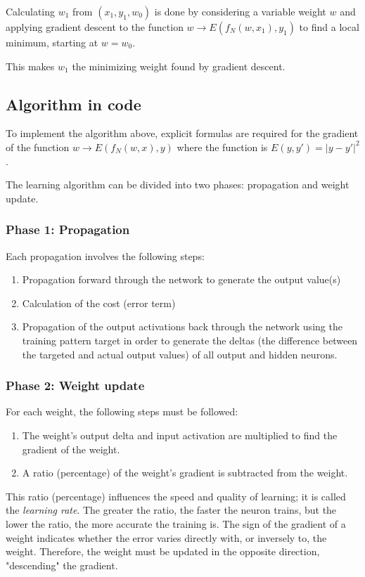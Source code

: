 \documentclass[a4paper]{article}
\begin{document}
Calculating $w_1$ from $(x_1, y_1, w_0)$ is done by considering a variable weight $w$ and applying gradient descent to the function $w\rightarrow E(f_N(w, x_1), y_1)$ to find a local minimum, starting at $w=w_0$.

This makes $w_1$ the minimizing weight found by gradient descent.

\subsection{Algorithm in code}
To implement the algorithm above, explicit formulas are required for the gradient of the function $w\rightarrow E(f_N(w,x),y)$ where the function is $E(y,y')=|y-y'|^2$.

The learning algorithm can be divided into two phases: propagation and weight update.
\subsubsection{Phase 1: Propagation}
Each propagation involves the following steps:
\begin{enumerate}
\item Propagation forward through the network to generate the output value(s)
\item Calculation of the cost (error term)
\item Propagation of the output activations back through the network using the training pattern target in order to generate the deltas (the difference between the targeted and actual output values) of all output and hidden neurons.
\end{enumerate}
\subsubsection{Phase 2: Weight update}
For each weight, the following steps must be followed:
\begin{enumerate}
\item The weight's output delta and input activation are multiplied to find the gradient of the weight.
\item A ratio (percentage) of the weight's gradient is subtracted from the weight.
\end{enumerate}

This ratio (percentage) influences the speed and quality of learning; it is called the\textit{ learning rate}. The greater the ratio, the faster the neuron trains, but the lower the ratio, the more accurate the training is. The sign of the gradient of a weight indicates whether the error varies directly with, or inversely to, the weight. Therefore, the weight must be updated in the opposite direction, "descending" the gradient.
\end{document}
